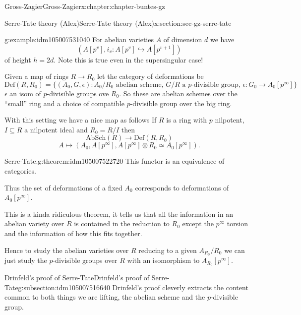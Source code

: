 \documentclass[oneside,10pt,]{book}
\numberwithin{equation}{section}
\newcommand{\lb}{[}
\newcommand{\rb}{]}
\begin{document}
\begin{chapterptx}{Gross-Zagier}{}{Gross-Zagier}{}{}{x:chapter:chapter-buntes-gz}
\begin{sectionptx}{Serre-Tate theory (Alex)}{}{Serre-Tate theory (Alex)}{}{}{x:section:sec-gz-serre-tate}
\begin{example}{}{g:example:idm105007531040}
For abelian varieties \(A\) of dimension \(d\) we have%
\begin{equation*}
(A[p^v], i_v\colon A[p^v] \hookrightarrow A[p^{v+1}])
\end{equation*}
of height \(h =2d\). Note this is true even in the supersingular case!%
\end{example}
Given a map of rings \(R \to R_0\) let the category of deformations be%
\begin{equation*}
\mathrm{Def}(R,R_0) =\{(A_0, G, \epsilon ) : A_0/R_0\text{ abelian scheme},\,G/R\text{ a }p\text{-divisible group},\,\epsilon \colon G_0 \to A_0 [p^\infty ]\}
\end{equation*}
\(\epsilon \) an isom of \(p\)-divisible groups ove \(R_0\). So these are abelian schemes over the ``small'' ring and a choice of compatible \(p\)-divisible group over the big ring.%
\par
With this setting we have a nice map as follows If \(R\) is a ring with \(p\) nilpotent, \(I \subseteq R\) a nilpotent ideal and \(R_0 = R/I\) then%
\begin{equation*}
\mathrm{AbSch}(R) \to \mathrm{Def}(R,R_0)
\end{equation*}
%
\begin{equation*}
A \mapsto (A_0, A[p^\infty ],A[p^\infty ]\otimes R_0 \simeq A_0 [p^\infty ])\text{.}
\end{equation*}
%
\begin{theorem}{Serre-Tate.}{}{g:theorem:idm105007522720}%
This functor is an equivalence of categories.%
\end{theorem}
Thus the set of deformations of a fixed \(A_0\) corresponds to deformations of \(A_0\lb p^\infty \rb \).%
\par
This is a kinda ridiculous theorem, it tells us that all the information in an abelian variety over \(R\) is contained in the reduction to \(R_0\) except the \(p^\infty\) torsion and the information of how this fits together.%
\par
Hence to study the abelian varieties over \(R\) reducing to a given \(A_{R_0}/R_0\) we can just study the \(p\)-divisible groups over \(R\) with an isomorphism to \(A_{R_0}\lb p^\infty\rb\).%
%
%
\typeout{************************************************}
\typeout{************************************************}
%
\begin{subsectionptx}{Drinfeld's proof of Serre-Tate}{}{Drinfeld's proof of Serre-Tate}{}{}{g:subsection:idm105007516640}
Drinfeld's proof cleverly extracts the content common to both things we are lifting, the abelian scheme and the \(p\)-divisible group.%

\end{subsectionptx}
\end{sectionptx}
\end{chapterptx}
\end{document}
